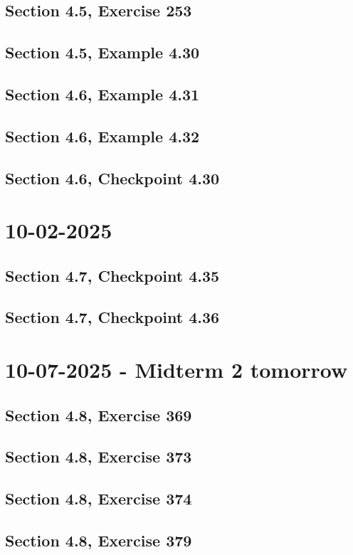 \documentclass[]{mangos-musings}
\begin{document}
\subsection{Section 4.5, Exercise 253}
\subsection{Section 4.5, Example 4.30}
\subsection{Section 4.6, Example 4.31}
\subsection{Section 4.6, Example 4.32}
\subsection{Section 4.6, Checkpoint 4.30}


\newpage
\section{10-02-2025}
\subsection{Section 4.7, Checkpoint 4.35}
\subsection{Section 4.7, Checkpoint 4.36}


\newpage
\section{10-07-2025 - Midterm 2 tomorrow}
\subsection{Section 4.8, Exercise 369}
\subsection{Section 4.8, Exercise 373}
\subsection{Section 4.8, Exercise 374}
\subsection{Section 4.8, Exercise 379}
\end{document}
